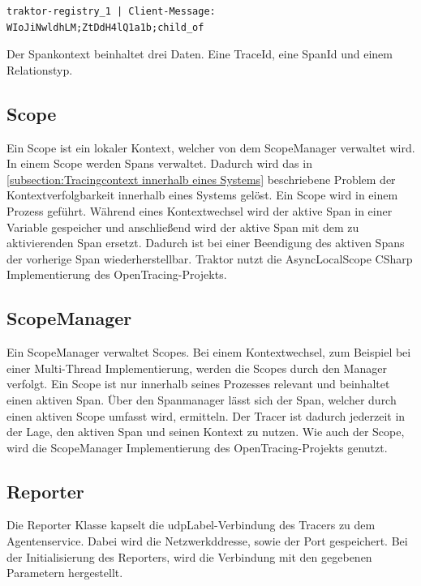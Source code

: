 \begin{minipage}[]{\textwidth}
	\begin{lstlisting}[frame=trBL]
	traktor-registry_1 | Client-Message: WIoJiNwldhLM;ZtDdH4lQ1a1b;child_of
	\end{lstlisting}
	\label{listing:SpanContext-Registry}
\end{minipage} 

Der Spankontext beinhaltet drei Daten. Eine TraceId, eine SpanId und einem Relationstyp.

\subsection{Scope}
\label{subsection:Scope}

Ein Scope ist ein lokaler Kontext, welcher von dem ScopeManager verwaltet wird. In einem Scope werden Spans verwaltet. Dadurch wird das in \cref{subsection:Tracingcontext innerhalb eines Systems} beschriebene Problem der Kontextverfolgbarkeit innerhalb eines Systems gelöst. Ein Scope wird in einem Prozess geführt. Während eines Kontextwechsel wird der aktive Span in einer Variable gespeicher und anschließend wird der aktive Span mit dem zu aktivierenden Span ersetzt. Dadurch ist bei einer Beendigung des aktiven Spans der vorherige Span wiederherstellbar. Traktor nutzt die AsyncLocalScope CSharp Implementierung des OpenTracing-Projekts.

\subsection{ScopeManager}
\label{subsection:ScopeManager}
Ein ScopeManager verwaltet Scopes. Bei einem Kontextwechsel, zum Beispiel bei einer Multi-Thread Implementierung, werden die Scopes durch den Manager verfolgt. Ein Scope ist nur innerhalb seines Prozesses relevant und beinhaltet einen aktiven Span. Über den Spanmanager lässt sich der Span, welcher durch einen aktiven Scope umfasst wird, ermitteln. Der Tracer ist dadurch jederzeit in der Lage, den aktiven Span und seinen Kontext zu nutzen. Wie auch der Scope, wird die ScopeManager Implementierung des OpenTracing-Projekts genutzt. 

\subsection{Reporter}
\label{subsection:Reporter}
Die Reporter Klasse kapselt die \gls{udpLabel}-Verbindung des Tracers zu dem Agentenservice. Dabei wird die Netzwerkddresse, sowie der Port gespeichert. Bei der Initialisierung des Reporters, wird die Verbindung mit den gegebenen Parametern hergestellt.

